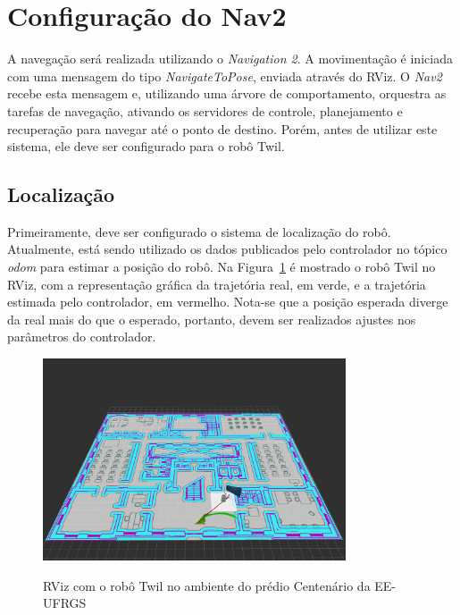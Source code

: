 \documentclass[repeatfields,xlists,xpacks,oneside,yearsonly]{ufrgscca}
\begin{document}
\section{Configuração do Nav2}

A navegação será realizada utilizando o \textit{Navigation 2}.
A movimentação é iniciada com uma mensagem do tipo \textit{NavigateToPose},
enviada através do RViz.
O \textit{Nav2} recebe esta mensagem e, utilizando uma árvore de comportamento,
orquestra as tarefas de navegação, ativando os servidores de controle, planejamento
e recuperação para navegar até o ponto de destino.
Porém, antes de utilizar este sistema, ele deve ser configurado para o robô Twil.

\subsection{Localização}

Primeiramente, deve ser configurado o sistema de localização do robô.
Atualmente, está sendo utilizado os dados publicados pelo controlador no
tópico \textit{odom} para estimar a posição do robô.
Na Figura~\ref{fig:robo_rviz} é mostrado o robô Twil no RViz, com a representação
gráfica da trajetória real, em verde, e a trajetória estimada pelo controlador,
em vermelho.
Nota-se que a posição esperada diverge da real mais do que o esperado, portanto,
devem ser realizados ajustes nos parâmetros do controlador.

\begin{figure}[htbp]
    {
        \centering
        \caption{RViz com o robô Twil no ambiente do prédio Centenário da EE-UFRGS}
        \label{fig:robo_rviz}
        \includegraphics[width=0.8\textwidth]{erro_de_odometria.png}\\
    }
    {}
\end{figure}
\end{document}
